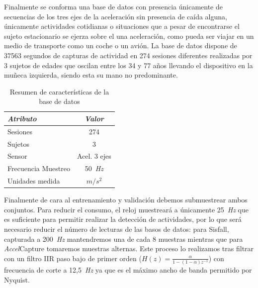 \documentclass[11pt,a4paper,spanish,twocolumn]{article}
\def\accelcapture/{\textsl{\textsf{Accel}}\textsf{Capture}}
\def\hz/{~\textsl{Hz}}
\begin{document}
Finalmente se conforma una base de datos con presencia únicamente de secuencias de los tres ejes de la aceleración sin presencia de caída alguna, únicamente actividades cotidianas o situaciones que a pesar de encontrarse el sujeto estacionario se ejerza sobre el una aceleración, como pueda ser viajar en un medio de transporte como un coche o un avión. La base de datos dispone de 37563 segundos de capturas de actividad en 274 sesiones diferentes realizadas por 3 sujetos de edades que oscilan entre los 34 y 77 años llevando el dispositivo en la muñeca izquierda, siendo esta su mano no predominante. 

\begin{table}
  \caption{\label{tab:accelcapture:description} Resumen de características de la base de datos}
  \centering
  \begin{tabular}{lc}\toprule
  \textit{Atributo}      & \textit{Valor}  \\\midrule
  Sesiones      & 274    \\
  Sujetos       & 3      \\
  Sensor        & Acel. 3 ejes \\
  Frecuencia Muestreo & 50\hz/  \\
  Unidades medida & $m/s^2$  \\ \bottomrule
  \end{tabular}
\end{table}

Finalmente de cara al entrenamiento y validación debemos submuestrear ambos conjuntos. Para reducir el consumo, el reloj muestreará a únicamente 25\hz/ que es suficiente para permitir realizar la detección de actividades\cite{Liu2018}, por lo que será necesario reducir el número de lecturas de las basos de datos: para Sisfall, capturada a 200\hz/ mantendremos una de cada 8 muestras mientras que para \accelcapture/ tomaremos muestras alternas. Este proceso lo realizamos tras filtrar con un filtro IIR paso bajo de primer orden ($H(z) = \frac{\alpha}{1-(1-\alpha)z^{-1}}$) con frecuencia de corte a 12,5\hz/ ya que es el máximo ancho de banda permitido por Nyquist. 
\end{document}
